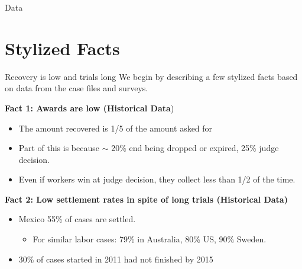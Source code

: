 \documentclass[9pt]{beamer}
\begin{document}
\begin{frame}{Data}
  
       
\end{frame}

\section{Stylized Facts}


\begin{frame}{Recovery is low and trials long}
We begin by describing a few stylized facts based on data from the case files and surveys. 
\vspace{0.2in}

\textbf{Fact 1: Awards are low (Historical Data})
    \begin{itemize}
        \item  The amount recovered is 1/5 of the amount asked for
        \item Part of this is because $\sim$ 20\% end being dropped or expired, 25\% judge decision.
        \item Even if workers win at judge decision, they  collect less than 1/2 of the time.
            
    \end{itemize}
    
    \pause
    \vspace{.4in}
    \textbf{Fact 2: Low settlement rates in spite of long trials (Historical Data)}
    \vspace{.05in}
    \begin{itemize}
        \item Mexico 55\% of cases are settled. 
        \begin{itemize}
            \item For similar labor cases: 79\% in Australia, 80\% US, 90\% Sweden.
        \end{itemize}
        \vspace{.05in}
        \item 30\% of cases started in 2011 had not finished by 2015
    \end{itemize}

    
\end{frame}
\end{document}
